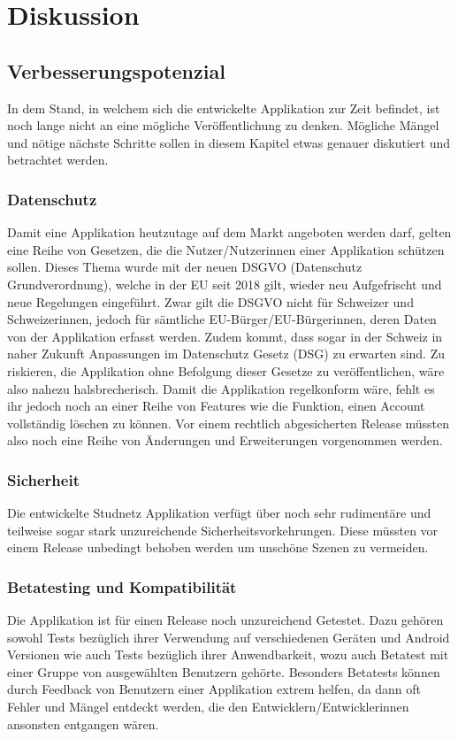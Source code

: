 \documentclass[../main.tex]{subfiles}
\begin{document}
	\chapter{Diskussion}
	
	\section{Verbesserungspotenzial}
	In dem Stand, in welchem sich die entwickelte Applikation zur Zeit befindet, ist noch lange nicht an eine mögliche Veröffentlichung zu denken. Mögliche Mängel und nötige nächste Schritte sollen in diesem Kapitel etwas genauer diskutiert und betrachtet werden.
	
	\subsection*{Datenschutz}
	Damit eine Applikation heutzutage auf dem Markt angeboten werden darf, gelten eine Reihe von Gesetzen, die die Nutzer/Nutzerinnen einer Applikation schützen sollen.  Dieses Thema wurde mit der neuen DSGVO (Datenschutz Grundverordnung), welche in der EU seit 2018 gilt,  wieder neu Aufgefrischt und neue Regelungen eingeführt. Zwar gilt die DSGVO nicht für Schweizer und Schweizerinnen, jedoch für sämtliche EU-Bürger/EU-Bürgerinnen, deren Daten von der Applikation erfasst werden. Zudem kommt, dass sogar in der Schweiz in naher Zukunft Anpassungen im Datenschutz Gesetz (DSG) zu erwarten sind. Zu riskieren, die Applikation ohne Befolgung dieser Gesetze zu veröffentlichen, wäre also nahezu halsbrecherisch. Damit die Applikation regelkonform wäre, fehlt es ihr jedoch noch an einer Reihe von Features wie die Funktion, einen Account vollständig löschen zu können. Vor einem rechtlich abgesicherten Release müssten also noch eine Reihe von Änderungen und Erweiterungen vorgenommen werden.  \cite{dsgvoschweiz}
	
	\subsection*{Sicherheit}
	Die entwickelte Studnetz Applikation verfügt über noch sehr rudimentäre und teilweise sogar stark unzureichende Sicherheitsvorkehrungen. Diese müssten vor einem Release unbedingt behoben werden um unschöne Szenen zu vermeiden.
	
	\subsection*{Betatesting und Kompatibilität}
	Die Applikation ist für einen Release noch unzureichend Getestet. Dazu gehören sowohl Tests bezüglich ihrer Verwendung auf verschiedenen Geräten und Android Versionen wie auch Tests bezüglich ihrer Anwendbarkeit, wozu auch Betatest mit einer Gruppe von ausgewählten Benutzern gehörte. Besonders Betatests können durch Feedback von Benutzern einer Applikation extrem helfen, da dann oft Fehler und Mängel entdeckt werden, die den Entwicklern/Entwicklerinnen ansonsten entgangen wären.
	
\end{document}
